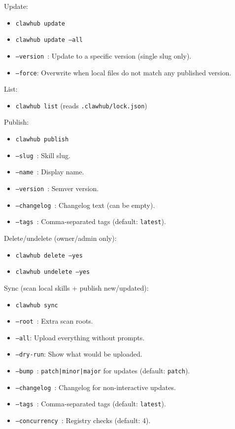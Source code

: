 Update:

\begin{itemize}
  \item \texttt{clawhub update }
  \item \texttt{clawhub update --all}
  \item \texttt{--version }: Update to a specific version (single slug only).
  \item \texttt{--force}: Overwrite when local files do not match any published version.
\end{itemize}


List:

\begin{itemize}
  \item \texttt{clawhub list} (reads \texttt{.clawhub/lock.json})
\end{itemize}


Publish:

\begin{itemize}
  \item \texttt{clawhub publish }
  \item \texttt{--slug }: Skill slug.
  \item \texttt{--name }: Display name.
  \item \texttt{--version }: Semver version.
  \item \texttt{--changelog }: Changelog text (can be empty).
  \item \texttt{--tags }: Comma-separated tags (default: \texttt{latest}).
\end{itemize}


Delete/undelete (owner/admin only):

\begin{itemize}
  \item \texttt{clawhub delete  --yes}
  \item \texttt{clawhub undelete  --yes}
\end{itemize}


Sync (scan local skills + publish new/updated):

\begin{itemize}
  \item \texttt{clawhub sync}
  \item \texttt{--root }: Extra scan roots.
  \item \texttt{--all}: Upload everything without prompts.
  \item \texttt{--dry-run}: Show what would be uploaded.
  \item \texttt{--bump }: \texttt{patch|minor|major} for updates (default: \texttt{patch}).
  \item \texttt{--changelog }: Changelog for non-interactive updates.
  \item \texttt{--tags }: Comma-separated tags (default: \texttt{latest}).
  \item \texttt{--concurrency }: Registry checks (default: 4).
\end{itemize}


